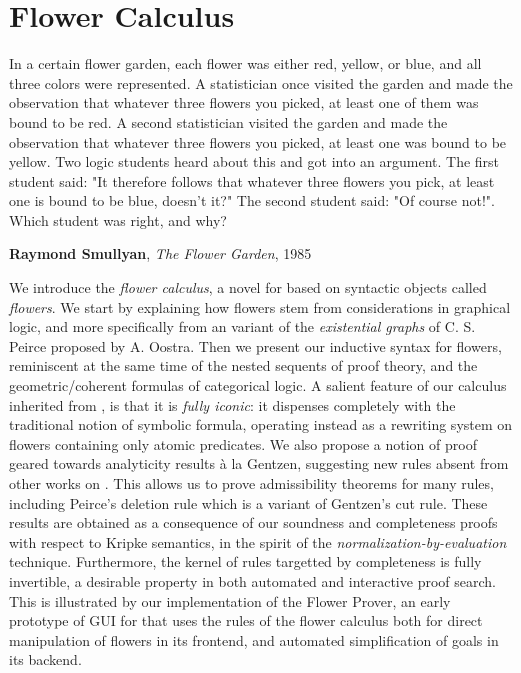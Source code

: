 \setchapterpreamble[u]{\margintoc}
\chapter{Flower Calculus}

\epigraph{In a certain flower garden, each flower was either red, yellow, or
blue, and all three colors were represented. A statistician once visited the
garden and made the observation that whatever three flowers you picked, at least
one of them was bound to be red. A second statistician visited the garden and
made the observation that whatever three flowers you picked, at least one was
bound to be yellow. Two logic students heard about this and got into an
argument. The first student said: "It therefore follows that whatever three
flowers you pick, at least one is bound to be blue, doesn't it?" The second
student said: "Of course not!". Which student was right, and why?
}{\textbf{Raymond Smullyan}, \textit{The Flower Garden}, 1985}

We introduce the \emph{flower calculus}, a novel  for 
 based on syntactic objects called \emph{flowers}. We start by
explaining how flowers stem from considerations in graphical logic, and more
specifically from an  variant of the \emph{existential graphs} of
C. S. Peirce proposed by A. Oostra. Then we present our inductive syntax for
flowers, reminiscent at the same time of the nested sequents of 
proof theory, and the geometric/coherent formulas of categorical logic. A
salient feature of our calculus inherited from , is that it is \emph{fully
iconic}: it dispenses completely with the traditional notion of symbolic
formula, operating instead as a rewriting system on flowers containing only
atomic predicates. We also propose a notion of proof geared towards analyticity
results à la Gentzen, suggesting new rules absent from other works on
 . This allows us to prove admissibility theorems for many
rules, including Peirce's deletion rule which is a variant of Gentzen's cut
rule. These results are obtained as a consequence of our soundness and
completeness proofs with respect to Kripke semantics, in the spirit of the
\emph{normalization-by-evaluation} technique. Furthermore, the kernel of rules
targetted by completeness is fully invertible, a desirable property in both
automated and interactive proof search. This is illustrated by our
implementation of the Flower Prover, an early prototype of GUI for  that
uses the rules of the flower calculus both for direct manipulation of flowers in
its frontend, and automated simplification of goals in its backend.

